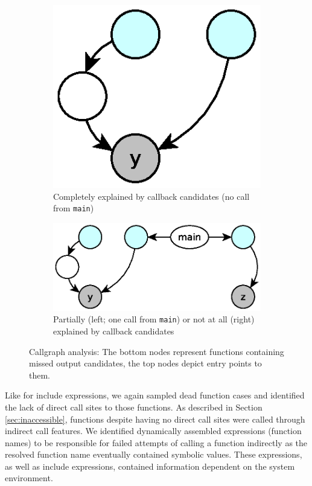 \documentclass[preprint]{sig-alternate-05-2015}
\begin{document}
\begin{figure}
	\centering
	\begin{subfigure}[t]{0.18\textwidth}
	\centering
		\includegraphics[scale=0.4]{images-paper/callgraph_a}
		\caption{Completely explained by callback candidates (no call from
		\texttt{main})}
		\label{fig:callgraph_a}
    \end{subfigure}
	\hfill
	\begin{subfigure}[t]{0.25\textwidth}
	\centering
		\includegraphics[scale=0.4]{images-paper/callgraph_b}
		\caption{Partially (left; one call from \texttt{main}) or not at all  (right)
		explained by callback candidates}
		\label{fig:callgraph_b}
    \end{subfigure}
    \caption{Callgraph analysis: The bottom nodes represent functions containing missed output candidates, the top nodes depict entry points to them.}
    \label{fig:callgraph}
\end{figure}

Like for include expressions, we again sampled dead function cases and identified the lack of direct call sites to those functions. As described in Section \ref{sec:inaccessible}, functions despite having no direct call sites were called through indirect call features. We identified dynamically assembled expressions (function names) to be responsible for failed attempts of calling a function indirectly as the resolved function name eventually contained symbolic values. These expressions, as well as include expressions, contained information dependent on the system environment.
\end{document}

